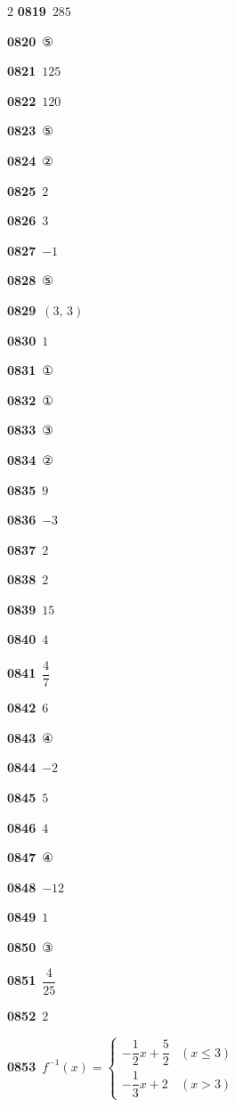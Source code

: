 \documentclass[10pt,a4paper]{article}
\begin{document}
\begin{multicols}{2}
\noindent\textbf{0819}\ $285$\par
\noindent\textbf{0820}\ ⑤\par
\noindent\textbf{0821}\ $125$\par
\noindent\textbf{0822}\ $120$\par
\noindent\textbf{0823}\ ⑤\par
\noindent\textbf{0824}\ ②\par
\noindent\textbf{0825}\ $2$\par
\noindent\textbf{0826}\ $3$\par
\noindent\textbf{0827}\ $-1$\par
\noindent\textbf{0828}\ ⑤\par
\noindent\textbf{0829}\ $(3,\,3)$\par
\noindent\textbf{0830}\ $1$\par
\noindent\textbf{0831}\ ①\par
\noindent\textbf{0832}\ ①\par
\noindent\textbf{0833}\ ③\par
\noindent\textbf{0834}\ ②\par
\noindent\textbf{0835}\ $9$\par
\noindent\textbf{0836}\ $-3$\par
\noindent\textbf{0837}\ $2$\par
\noindent\textbf{0838}\ $2$\par
\noindent\textbf{0839}\ $15$\par
\noindent\textbf{0840}\ $4$\par
\noindent\textbf{0841}\ $\dfrac{4}{7}$\par
\noindent\textbf{0842}\ $6$\par
\noindent\textbf{0843}\ ④\par
\noindent\textbf{0844}\ $-2$\par
\noindent\textbf{0845}\ $5$\par
\noindent\textbf{0846}\ $4$\par
\noindent\textbf{0847}\ ④\par
\noindent\textbf{0848}\ $-12$\par
\noindent\textbf{0849}\ $1$\par
\noindent\textbf{0850}\ ③\par
\noindent\textbf{0851}\ $\dfrac{4}{25}$\par
\noindent\textbf{0852}\ $2$\par
\noindent\textbf{0853}\ $f^{-1}(x)=\begin{cases} -\dfrac{1}{2}x+\dfrac{5}{2} & (x\le 3) \\[1ex] -\dfrac{1}{3}x+2 & (x>3) \end{cases}$\par

\end{multicols}
\end{document}
